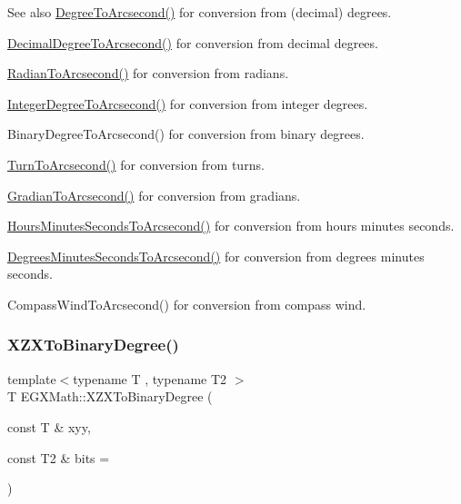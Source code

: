 \begin{DoxySeeAlso}{See also}
\mbox{\hyperlink{group___e_g_x_math-_angle_conversions-_degree_gaf85e2d765c248f447854a807a68a5de8}{Degree\+To\+Arcsecond()}} for conversion from (decimal) degrees. 

\mbox{\hyperlink{group___e_g_x_math-_angle_conversions-_decimal_degree_gab9d5635a6e35127b5245978aba508962}{Decimal\+Degree\+To\+Arcsecond()}} for conversion from decimal degrees. 

\mbox{\hyperlink{group___e_g_x_math-_angle_conversions-_radian_ga2f952f6675a0fc54bf72bfe4e3d2664a}{Radian\+To\+Arcsecond()}} for conversion from radians. 

\mbox{\hyperlink{group___e_g_x_math-_angle_conversions-_integer_degree_gaa04058a2fea3dc3678264a05fac6e1ae}{Integer\+Degree\+To\+Arcsecond()}} for conversion from integer degrees. 

Binary\+Degree\+To\+Arcsecond() for conversion from binary degrees. 

\mbox{\hyperlink{group___e_g_x_math-_angle_conversions-_turn_gaad072969abc59ef6f5b63ac6a176a11b}{Turn\+To\+Arcsecond()}} for conversion from turns. 

\mbox{\hyperlink{group___e_g_x_math-_angle_conversions-_gradian_gac768fd444195264165d332f2f5e84d92}{Gradian\+To\+Arcsecond()}} for conversion from gradians. 

\mbox{\hyperlink{group___e_g_x_math-_angle_conversions-_hours_minutes_seconds_ga14620899c81c1f5e65cde96ef4ee626e}{Hours\+Minutes\+Seconds\+To\+Arcsecond()}} for conversion from hours minutes seconds. 

\mbox{\hyperlink{group___e_g_x_math-_angle_conversions-_degrees_minutes_seconds_gabebc8a012be0442c12409a2a71661ed4}{Degrees\+Minutes\+Seconds\+To\+Arcsecond()}} for conversion from degrees minutes seconds. 

Compass\+Wind\+To\+Arcsecond() for conversion from compass wind. 
\end{DoxySeeAlso}
\mbox{\label{group___e_g_x_math-_angle_conversions-_x_z_x_ga245f7fe63a1fec3b66d44f5ad07abc72}} 
\subsubsection{\texorpdfstring{X\+Z\+X\+To\+Binary\+Degree()}{XZXToBinaryDegree()}}
{\footnotesize\ttfamily template$<$typename T , typename T2 $>$ \\
T E\+G\+X\+Math\+::\+X\+Z\+X\+To\+Binary\+Degree (\begin{DoxyParamCaption}\item[{const T \&}]{xyy,  }\item[{const T2 \&}]{bits = {} }\end{DoxyParamCaption})}



